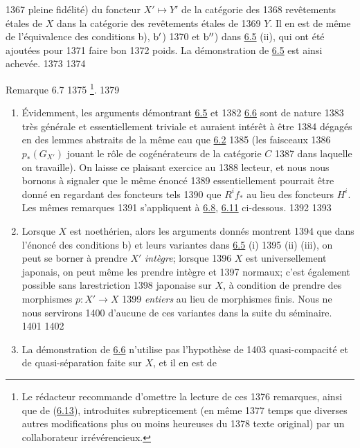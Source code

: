   1367	pleine fidélité) du foncteur $X'\mapsto Y'$ de la catégorie des
  1368	revêtements étales de $X$ dans la catégorie des revêtements étales de
  1369	$Y$. Il en est de même de l'équivalence des conditions b), ${\rm b'}$)
  1370	et ${\rm b''}$) dans \hyperref[XII.prop6.5]{6.5} (ii), qui ont été ajoutées pour
  1371	faire bon 
  1372	poids. La démonstration de \hyperref[XII.prop6.5]{6.5} est ainsi achevée.
  1373	
  1374	\begin{enonce*}[remark]{Remarque 6.7}
  1375	\footnote{Le rédacteur recommande d'omettre la lecture de ces
  1376	remarques, ainsi que de (\hyperref[XII.rems6.13]{6.13}), introduites subrepticement (en même
  1377	temps que diverses autres modifications plus ou moins heureuses du
  1378	texte original) par un collaborateur irrévérencieux.}.
  1379	\begin{enumerate}
  1380	\renewcommand{\labelenumi}{\theenumi)}
  1381	\item Évidemment, les arguments démontrant \hyperref[XII.prop6.5]{6.5} et
  1382	  \hyperref[XII.cor6.6]{6.6} sont de nature 
  1383	très générale et essentiellement triviale et auraient intérêt à être
  1384	dégagés en des lemmes abstraits de la même eau que \hyperref[XII.lem6.2]{6.2}
  1385	(les faisceaux 
  1386	$p_{\ast}(G_{X'})$ jouant le rôle de cogénérateurs de la catégorie $C$
  1387	dans laquelle on travaille). On laisse ce plaisant exercice au
  1388	lecteur, et nous nous bornons à signaler que le même énoncé
  1389	essentiellement pourrait être donné en regardant des foncteurs tels
  1390	que $R^{i}f_{\ast}$ au lieu des foncteurs $H^{i}$. Les mêmes remarques
  1391	s'appliquent à \hyperref[XII.prop6.8]{6.8}, \hyperref[XII.prop6.11]{6.11} ci-dessous.
  1392	
  1393	\item Lorsque $X$ est noethérien, alors les arguments donnés montrent
  1394	que dans l'énoncé des conditions b) et leurs variantes dans \hyperref[XII.prop6.5]{6.5} (i)
  1395	(ii) (iii), on peut se borner à prendre $X'$ \emph{intègre}; lorsque
  1396	$X$ est universellement japonais, on peut même les prendre intègre et
  1397	normaux; c'est également possible sans la\pageoriginale restriction
  1398	japonaise sur $X$, à condition de prendre des morphismes $p:X'\rightarrow X$
  1399	\emph{entiers} au lieu de morphismes finis. Nous ne nous servirons
  1400	d'aucune de ces variantes dans la suite du séminaire.
  1401	
  1402	\item La démonstration de \hyperref[XII.cor6.6]{6.6} n'utilise pas l'hypothèse de
  1403	quasi-compacité et de quasi-séparation faite sur $X$, et il en est de

\end{enumerate}
\end{enonce*}
